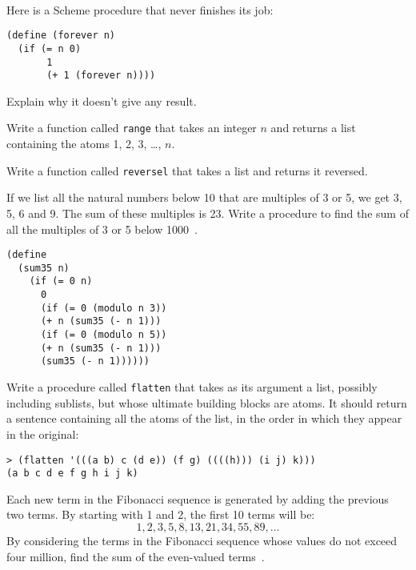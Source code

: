 \begin{questions}
\begin{solution}
  \begin{verbatim}
  
  \end{verbatim}
\end{solution}

\question
Here is a Scheme procedure that never finishes its job:
\begin{verbatim}
(define (forever n)
  (if (= n 0)
       1
       (+ 1 (forever n))))
\end{verbatim}
Explain why it doesn’t give any result\cite{simplyscheme}.

\question
Write a function called \texttt{range} that takes an integer $n$ and returns a list containing the atoms 1, 2, 3, \ldots, $n$.

\question
Write a function called \texttt{reversel} that takes a list and returns it reversed.	

\question
If we list all the natural numbers below 10 that are multiples of 3 or 5, we get 3, 5, 6 and 9.
The sum of these multiples is 23.
Write a procedure to find the sum of all the multiples of 3 or 5 below 1000~\cite{projecteuler}.

\begin{solution}
  \begin{verbatim}
(define 
  (sum35 n)
    (if (= 0 n)
      0
      (if (= 0 (modulo n 3))
      (+ n (sum35 (- n 1)))
      (if (= 0 (modulo n 5))
      (+ n (sum35 (- n 1)))
      (sum35 (- n 1))))))
  \end{verbatim}
\end{solution}

\question
Write a procedure called \texttt{flatten} that takes as its argument a list, possibly including sublists, but whose ultimate building blocks are atoms.
It should return a sentence containing all the atoms of the list, in the order in which they appear in the original:
\begin{verbatim}
> (flatten '(((a b) c (d e)) (f g) ((((h))) (i j) k)))
(a b c d e f g h i j k)
\end{verbatim}


\question
Each new term in the Fibonacci sequence is generated by adding the previous two terms.
By starting with 1 and 2, the first 10 terms will be:
\[ 1, 2, 3, 5, 8, 13, 21, 34, 55, 89, \ldots \]
By considering the terms in the Fibonacci sequence whose values do not exceed four million, find the sum of the even-valued terms~\cite{projecteuler}.


\end{questions}

